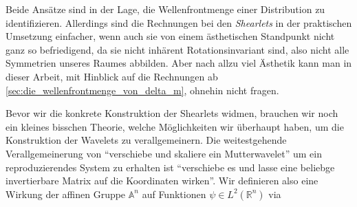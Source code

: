
Beide Ansätze sind in der Lage, die Wellenfrontmenge einer Distribution zu identifizieren. Allerdings sind die Rechnungen bei den \textit{Shearlets} in der praktischen Umsetzung einfacher, wenn auch sie von einem ästhetischen Standpunkt nicht ganz so befriedigend, da sie nicht inhärent Rotationsinvariant sind, also nicht alle Symmetrien unseres Raumes abbilden. Aber nach allzu viel Ästhetik kann man in dieser Arbeit, mit Hinblick auf die Rechnungen ab \cref{sec:die_wellenfrontmenge_von_delta_m}, ohnehin nicht fragen.

Bevor wir die konkrete Konstruktion der Shearlets widmen, brauchen wir noch ein kleines bisschen Theorie, welche Möglichkeiten wir überhaupt haben, um die Konstruktion der Wavelets zu verallgemeinern. Die weitestgehende Verallgemeinerung von "`verschiebe und skaliere ein Mutterwavelet"' um ein reproduzierendes System zu erhalten ist "`verschiebe es und lasse eine beliebge invertierbare Matrix auf die Koordinaten wirken"'. Wir definieren also eine Wirkung der affinen Gruppe $\mathbb{A}^n$ auf Funktionen $\psi \in L^2(\mathbb{R}^n)$ via

